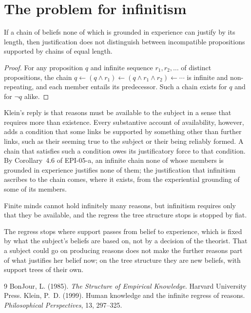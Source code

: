 \documentclass{situationist-preprint}
\begin{document}
\section{The problem for infinitism}

\begin{proposition}\label{p:idle}
If a chain of beliefs none of which is grounded in experience can justify by its length, then justification does not distinguish between incompatible propositions supported by chains of equal length.
\end{proposition}

\begin{proof}
For any proposition $q$ and infinite sequence $r_1, r_2, \ldots$ of distinct propositions, the chain $q \leftarrow (q \wedge r_1) \leftarrow (q \wedge r_1 \wedge r_2) \leftarrow \cdots$ is infinite and non-repeating, and each member entails its predecessor. Such a chain exists for $q$ and for $\neg q$ alike.
\end{proof}

Klein's reply is that reasons must be available to the subject in a sense that requires more than existence. Every substantive account of availability, however, adds a condition that some links be supported by something other than further links, such as their seeming true to the subject or their being reliably formed. A chain that satisfies such a condition owes its justificatory force to that condition. By Corollary~4.6 of EPI-05-a, an infinite chain none of whose members is grounded in experience justifies none of them; the justification that infinitism ascribes to the chain comes, where it exists, from the experiential grounding of some of its members.

\begin{objection}
Finite minds cannot hold infinitely many reasons, but infinitism requires only that they be available, and the regress the tree structure stops is stopped by fiat.
\end{objection}

\begin{reply}
The regress stops where support passes from belief to experience, which is fixed by what the subject's beliefs are based on, not by a decision of the theorist. That a subject could go on producing reasons does not make the further reasons part of what justifies her belief now; on the tree structure they are new beliefs, with support trees of their own.
\end{reply}

\begin{thebibliography}{9}\small
{} BonJour, L. (1985). \emph{The Structure of Empirical Knowledge}. Harvard University Press.
 Klein, P.~D. (1999). Human knowledge and the infinite regress of reasons. \emph{Philosophical Perspectives}, 13, 297--325.
\end{thebibliography}
\end{document}
